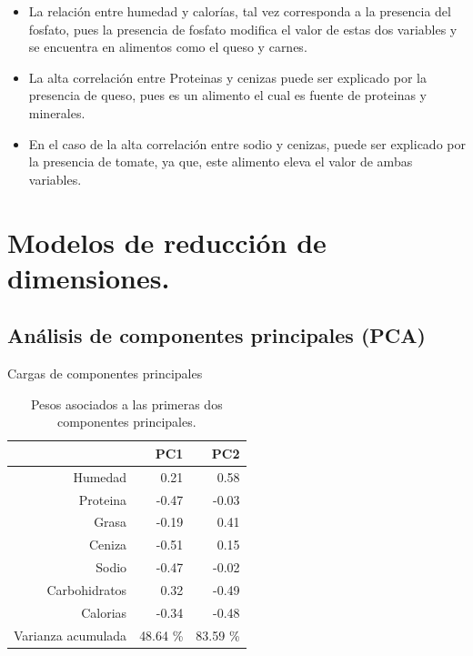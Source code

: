\documentclass[pdf]{beamer}
\begin{document}
\begin{frame}
\begin{itemize}
\item La relación entre humedad y calorías, tal vez corresponda a la presencia del fosfato, pues la presencia de fosfato modifica el valor de estas dos variables y se encuentra en alimentos como el queso y carnes.\\

\item La alta correlación entre Proteinas y cenizas puede ser explicado por la presencia de queso, pues es un alimento el cual es fuente de proteinas y minerales.\\

\item En el caso de la alta correlación entre sodio y cenizas, puede ser explicado por la presencia de tomate, ya que, este alimento eleva el valor de ambas variables.\\
\end{itemize}
\end{frame}

\section{Modelos de reducción de dimensiones.}

\subsection{Análisis de componentes principales (PCA)}

\begin{frame}{Cargas de componentes principales}
\begin{table}[ht]
\centering
\begin{tabular}{rrr}
  \hline
 & PC1 & PC2 \\ 
  \hline
Humedad & 0.21 & 0.58 \\ 
  Proteina & -0.47 & -0.03 \\ 
  Grasa & -0.19 & 0.41 \\ 
  Ceniza & -0.51 & 0.15 \\ 
  Sodio & -0.47 & -0.02 \\ 
  Carbohidratos & 0.32 & -0.49 \\ 
  Calorias & -0.34 & -0.48 \\ 
  Varianza acumulada & 48.64 \% &  83.59 \% \\ 
\end{tabular}
	\label{tabla:pesos_PCA}
	\caption{Pesos asociados a las primeras dos componentes principales.}
\end{table}
\end{frame}
\end{document}
